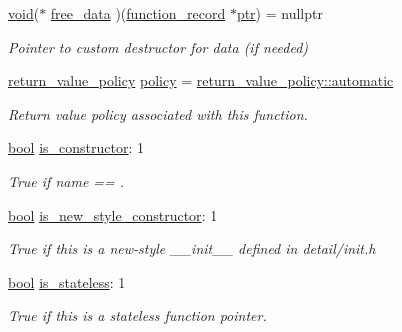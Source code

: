 \begin{DoxyCompactItemize}
\mbox{\hyperlink{_s_d_l__opengles2__gl2ext_8h_ae5d8fa23ad07c48bb609509eae494c95}{void}}($\ast$ \mbox{\hyperlink{structfunction__record_aa3019482c3aba125c05edf641d557576}{free\+\_\+data}} )(\mbox{\hyperlink{structfunction__record}{function\+\_\+record}} $\ast$\mbox{\hyperlink{pystrtod_8h_a671b2e1a427060ad8b5362882ed58f5b}{ptr}}) = nullptr
\begin{DoxyCompactList}\small\item\em Pointer to custom destructor for \textquotesingle{}data\textquotesingle{} (if needed) \end{DoxyCompactList}\item 
\mbox{\hyperlink{detail_2common_8h_adde72ab1fb0dd4b48a5232c349a53841}{return\+\_\+value\+\_\+policy}} \mbox{\hyperlink{structfunction__record_a27926b7355bd89048ff5da97758b5282}{policy}} = \mbox{\hyperlink{detail_2common_8h_adde72ab1fb0dd4b48a5232c349a53841a2bd9c0ed00116be1258e0cc66617d7c8}{return\+\_\+value\+\_\+policy\+::automatic}}
\begin{DoxyCompactList}\small\item\em Return value policy associated with this function. \end{DoxyCompactList}\item 
\mbox{\hyperlink{asdl_8h_af6a258d8f3ee5206d682d799316314b1}{bool}} \mbox{\hyperlink{structfunction__record_aa014e3469d353ed93ffb67d626879a29}{is\+\_\+constructor}}\+: 1
\begin{DoxyCompactList}\small\item\em True if name == \textquotesingle{}. \end{DoxyCompactList}\item 
\mbox{\hyperlink{asdl_8h_af6a258d8f3ee5206d682d799316314b1}{bool}} \mbox{\hyperlink{structfunction__record_a2a002c9d435634209613d4be9f3d5d7c}{is\+\_\+new\+\_\+style\+\_\+constructor}}\+: 1
\begin{DoxyCompactList}\small\item\em True if this is a new-\/style {\ttfamily \+\_\+\+\_\+init\+\_\+\+\_\+} defined in {\ttfamily detail/init.\+h} \end{DoxyCompactList}\item 
\mbox{\hyperlink{asdl_8h_af6a258d8f3ee5206d682d799316314b1}{bool}} \mbox{\hyperlink{structfunction__record_abdee0c594dc06ef0b4d4b136255ea971}{is\+\_\+stateless}}\+: 1
\begin{DoxyCompactList}\small\item\em True if this is a stateless function pointer. \end{DoxyCompactList}\item 

\end{DoxyCompactItemize}

